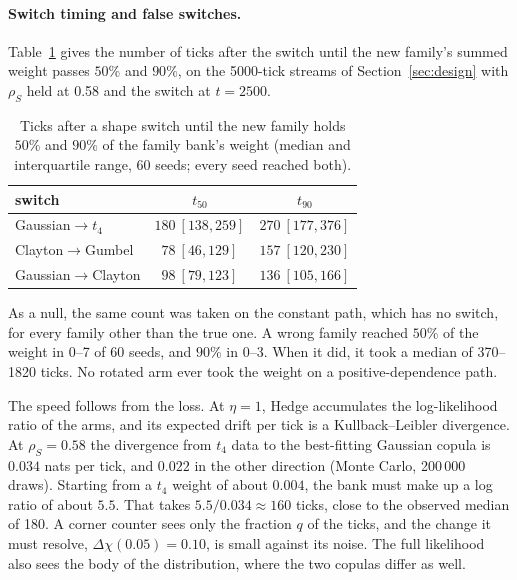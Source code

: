 \paragraph{Switch timing and false switches.} Table~\ref{tab:switch} gives the number of ticks after
the switch until the new family's summed weight passes $50\%$ and $90\%$, on the 5000-tick streams
of Section~\ref{sec:design} with $\rho_S$ held at 0.58 and the switch at $t=2500$.

\begin{table}[ht]
  \centering
  \caption{Ticks after a shape switch until the new family holds $50\%$ and $90\%$ of the family
    bank's weight (median and interquartile range, 60 seeds; every seed reached both).}
  \label{tab:switch}
  \small
  \begin{tabular}{lcc}
    \toprule
    switch & $t_{50}$ & $t_{90}$ \\
    \midrule
    Gaussian$\to t_4$       & $180\ [138,259]$ & $270\ [177,376]$ \\
    Clayton$\to$Gumbel      & $78\ [46,129]$   & $157\ [120,230]$ \\
    Gaussian$\to$Clayton    & $98\ [79,123]$   & $136\ [105,166]$ \\
    \bottomrule
  \end{tabular}
\end{table}

As a null, the same count was taken on the constant path, which has no switch, for every family other
than the true one. A wrong family reached $50\%$ of the weight in 0--7 of 60 seeds, and $90\%$ in
0--3. When it did, it took a median of 370--1820 ticks. No rotated arm ever took the weight on a
positive-dependence path.

The speed follows from the loss. At $\eta=1$, Hedge accumulates the log-likelihood ratio of the
arms, and its expected drift per tick is a Kullback--Leibler divergence. At $\rho_S=0.58$ the
divergence from $t_4$ data to the best-fitting Gaussian copula is $0.034$ nats per tick, and $0.022$
in the other direction (Monte Carlo, 200\,000 draws). Starting from a $t_4$ weight of about $0.004$,
the bank must make up a log ratio of about $5.5$. That takes $5.5/0.034\approx160$ ticks, close to
the observed median of 180. A corner counter sees only the fraction $q$ of the ticks, and the
change it must resolve, $\Delta\chi(0.05)=0.10$, is small against its noise. The full likelihood
also sees the body of the distribution, where the two copulas differ as well.

